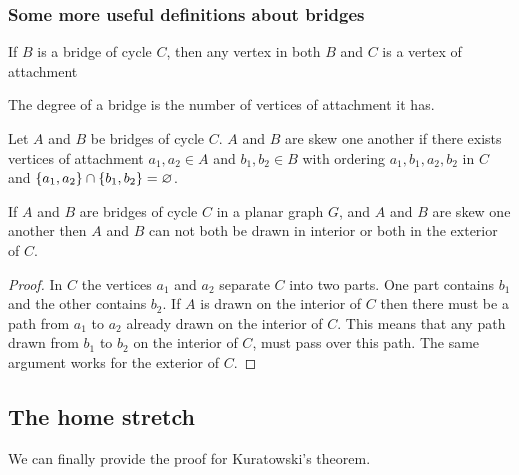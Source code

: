 \documentclass{article}
\begin{document}
\subsubsection{Some more useful definitions about bridges}
\begin{definition}
	If $B$ is a bridge of cycle $C$, then any vertex in both $B$ and $C$ is a vertex of attachment
\end{definition}

\begin{definition}[degree]
	The degree of a bridge is the number of vertices of attachment it has.
\end{definition}

\begin{definition}[Skew]
	Let $A$ and $B$ be bridges of cycle $C$. $A$ and $B$ are skew one another if there exists vertices of attachment $a_1, a_2 \in A$ and $b_1,b_2\in B$ with ordering $a_1,b_1,a_2,b_2$ in $C$ and $\left\{ {a_1,a_2} \right\}\cap\left\{ {b_1,b_2} \right\}=\varnothing$.
\end{definition}

\begin{lemma}\label{skew}
	If $A$ and $B$ are bridges of cycle $C$ in a planar graph $G$, and $A$ and $B$ are skew one another then $A$ and $B$ can not both be drawn in interior or both in the exterior of $C$.
\end{lemma}

\begin{proof}
	In $C$ the vertices $a_1$ and $a_2$ separate $C$ into two parts. One part contains $b_1$ and the other contains $b_2$. If $A$ is drawn on the interior of $C$ then there must be a path from $a_1$ to $a_2$ already drawn on the interior of $C$. This means that any path drawn from $b_1$ to $b_2$ on the interior of $C$, must pass over this path. The same argument works for the exterior of $C$. 
\end{proof}

\subsection{The home stretch}
We can finally provide the proof for Kuratowski's theorem.

\THEBIGONE*
\end{document}
